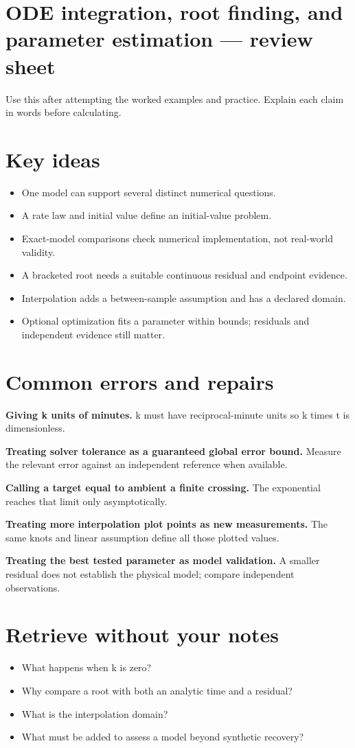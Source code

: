 \documentclass[11pt,letterpaper]{article}
\theoremstyle{definition}\newtheorem{definition}{Definition}\newtheorem{example}{Example}
\numberwithin{equation}{section}
\begin{document}
\section*{ODE integration, root finding, and parameter estimation --- review sheet}
Use this after attempting the worked examples and practice. Explain each claim in words before calculating.

\section*{Key ideas}
\begin{itemize}
\item One model can support several distinct numerical questions.
\item A rate law and initial value define an initial-value problem.
\item Exact-model comparisons check numerical implementation, not real-world validity.
\item A bracketed root needs a suitable continuous residual and endpoint evidence.
\item Interpolation adds a between-sample assumption and has a declared domain.
\item Optional optimization fits a parameter within bounds; residuals and independent evidence still matter.
\end{itemize}
\section*{Common errors and repairs}
\textbf{Giving k units of minutes.} k must have reciprocal-minute units so k times t is dimensionless.

\textbf{Treating solver tolerance as a guaranteed global error bound.} Measure the relevant error against an independent reference when available.

\textbf{Calling a target equal to ambient a finite crossing.} The exponential reaches that limit only asymptotically.

\textbf{Treating more interpolation plot points as new measurements.} The same knots and linear assumption define all those plotted values.

\textbf{Treating the best tested parameter as model validation.} A smaller residual does not establish the physical model; compare independent observations.

\section*{Retrieve without your notes}
\begin{itemize}
\item What happens when k is zero?
\item Why compare a root with both an analytic time and a residual?
\item What is the interpolation domain?
\item What must be added to assess a model beyond synthetic recovery?
\end{itemize}
\end{document}
